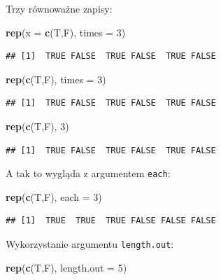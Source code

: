 \documentclass[]{book}
\newenvironment{Shaded}{\begin{snugshade}}{\end{snugshade}}
\newcommand{\KeywordTok}[1]{\textcolor[rgb]{0.13,0.29,0.53}{\textbf{#1}}}
\newcommand{\DataTypeTok}[1]{\textcolor[rgb]{0.13,0.29,0.53}{#1}}
\newcommand{\DecValTok}[1]{\textcolor[rgb]{0.00,0.00,0.81}{#1}}
\newcommand{\NormalTok}[1]{#1}
\begin{document}
Trzy równoważne zapisy:

\begin{Shaded}
\begin{Highlighting}[]
\KeywordTok{rep}\NormalTok{(}\DataTypeTok{x =} \KeywordTok{c}\NormalTok{(T,F), }\DataTypeTok{times =} \DecValTok{3}\NormalTok{)}
\end{Highlighting}
\end{Shaded}

\begin{verbatim}
## [1]  TRUE FALSE  TRUE FALSE  TRUE FALSE
\end{verbatim}

\begin{Shaded}
\begin{Highlighting}[]
\KeywordTok{rep}\NormalTok{(}\KeywordTok{c}\NormalTok{(T,F), }\DataTypeTok{times =} \DecValTok{3}\NormalTok{)}
\end{Highlighting}
\end{Shaded}

\begin{verbatim}
## [1]  TRUE FALSE  TRUE FALSE  TRUE FALSE
\end{verbatim}

\begin{Shaded}
\begin{Highlighting}[]
\KeywordTok{rep}\NormalTok{(}\KeywordTok{c}\NormalTok{(T,F), }\DecValTok{3}\NormalTok{)}
\end{Highlighting}
\end{Shaded}

\begin{verbatim}
## [1]  TRUE FALSE  TRUE FALSE  TRUE FALSE
\end{verbatim}

A tak to wygląda z argumentem \texttt{each}:

\begin{Shaded}
\begin{Highlighting}[]
\KeywordTok{rep}\NormalTok{(}\KeywordTok{c}\NormalTok{(T,F), }\DataTypeTok{each =} \DecValTok{3}\NormalTok{)}
\end{Highlighting}
\end{Shaded}

\begin{verbatim}
## [1]  TRUE  TRUE  TRUE FALSE FALSE FALSE
\end{verbatim}

Wykorzystanie argumentu \texttt{length.out}:

\begin{Shaded}
\begin{Highlighting}[]
\KeywordTok{rep}\NormalTok{(}\KeywordTok{c}\NormalTok{(T,F), }\DataTypeTok{length.out =} \DecValTok{5}\NormalTok{)}
\end{Highlighting}
\end{Shaded}
\end{document}
